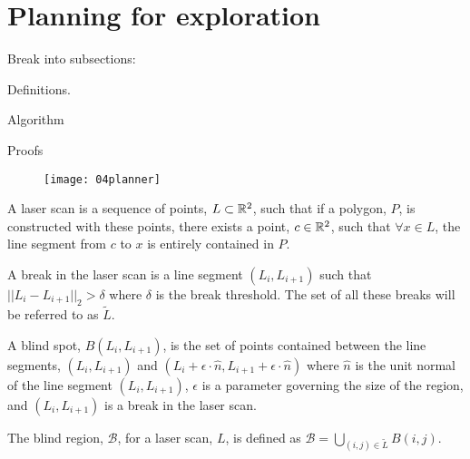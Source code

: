 
\section{Planning for exploration}

Break into subsections:

Definitions.

Algorithm

Proofs


\begin{figure}
    \centering
    \texttt{[image: 04planner]}
\end{figure}

\begin{definition}

    A laser scan is a sequence of points, $L \subset \mathbb{R}^2$, such that
    if a polygon, $P$, is constructed with these points, there exists a point,
    $c \in \mathbb{R}^2$, such that $\forall x \in L$, the line segment from
    $c$ to $x$ is entirely contained in $P$.

\end{definition}

\begin{definition}

    A break in the laser scan is a line segment $(L_i, L_{i + 1})$ such that
    $||L_i - L_{i + 1}||_2 > \delta$ where $\delta$ is the break threshold. The
    set of all these breaks will be referred to as $\tilde L$.

\end{definition}

\begin{definition}

    A blind spot, $B(L_i, L_{i + 1})$, is the set of points contained between
    the line segments, $(L_i, L_{i + 1})$ and $(L_i + \epsilon \cdot \hat n,
    L_{i + 1} + \epsilon \cdot \hat n)$ where $\hat n$ is the unit normal of
    the line segment $(L_i, L_{i + 1})$, $\epsilon$ is a parameter governing
    the size of the region, and $(L_i, L_{i + 1})$ is a break in the laser
    scan.

\end{definition}

\begin{definition}

    The blind region, $\mathcal{B}$, for a laser scan, $L$, is defined as
    $\mathcal{B} = \bigcup_{(i, j) \in \tilde L} B(i, j)$.

\end{definition}

